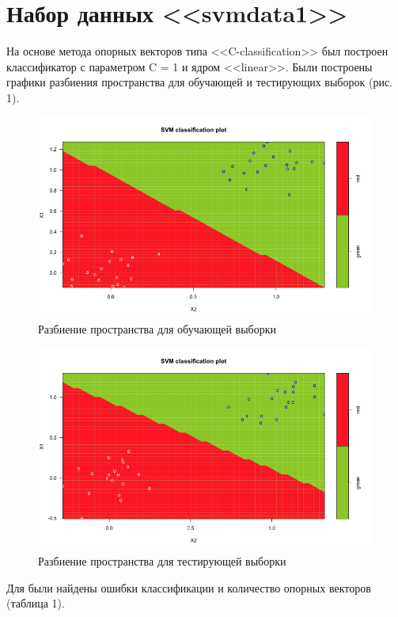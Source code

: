 \documentclass[]{article}
\numberwithin{equation}{section}
\begin{document}
    \section{Набор данных <<svmdata1>>}
        На основе метода опорных векторов типа <<C-classification>> был построен классификатор с параметром C = 1 и ядром <<linear>>. Были построены графики разбиения пространства для обучающей и тестирующих выборок (рис. 1).
        \vspace{-0.5cm}
        \begin{figure}[H]
            \centering
            \includegraphics[width = 0.9\linewidth]{data/data1_train_set.png}
            \caption{Разбиение пространства для обучающей выборки}
        \end{figure}
        \vspace{-1cm}
        \begin{figure}[H]
            \centering
            \includegraphics[width = 0.9\linewidth]{data/data1_test_set.png}
            \caption{Разбиение пространства для тестирующей выборки}
        \end{figure}

        Для были найдены ошибки классификации и количество опорных векторов (таблица 1).
\end{document}
